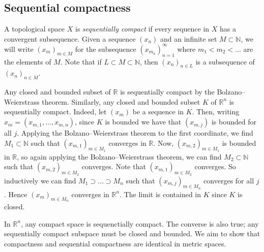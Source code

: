 \subsection{Sequential compactness}
\begin{definition}
	A topological space \( X \) is \textit{sequentially compact} if every sequence in \( X \) has a convergent subsequence.
	Given a sequence \( (x_n) \) and an infinite set \( M \subset \mathbb N \), we will write \( (x_m)_{m \in M} \) for the subsequence \( (x_{m_n})_{n=1}^\infty \) where \( m_1 < m_2 < \dots \) are the elements of \( M \).
	Note that if \( L \subset M \subset \mathbb N \), then \( (x_n)_{n \in L} \) is a subsequence of \( (x_n)_{n \in M} \).
\end{definition}
\begin{example}
	Any closed and bounded subset of \( \mathbb R \) is sequentially compact by the Bolzano--Weierstrass theorem.
	Similarly, any closed and bounded subset \( K \) of \( \mathbb R^n \) is sequentially compact.
	Indeed, let \( (x_m) \) be a sequence in \( K \).
	Then, writing \( x_m = (x_{m,1}, \dots, x_{m,n}) \), since \( K \) is bounded we have that \( (x_{m,j}) \) is bounded for all \( j \).
	Applying the Bolzano--Weierstrass theorem to the first coordinate, we find \( M_1 \subset \mathbb N \) such that \( (x_{m,1})_{m \in M_1} \) converges in \( \mathbb R \).
	Now, \( (x_{m,2})_{m \in M_1} \) is bounded in \( \mathbb R \), so again applying the Bolzano--Weierstrass theorem, we can find \( M_2 \subset \mathbb N \) such that \( (x_{m,2})_{m \in M_2} \) converges.
	Note that \( (x_{m,1})_{m \in M_2} \) converges.
	So inductively we can find \( M_1 \supset \dots \supset M_n \) such that \( (x_{m,j})_{m \in M_n} \) converges for all \( j \).
	Hence \( (x_m)_{m \in M_n} \) converges in \( \mathbb R^n \).
	The limit is contained in \( K \) since \( K \) is closed.
\end{example}
\begin{remark}
	In \( \mathbb R^n \), any compact space is sequenctially compact.
	The converse is also true; any sequentially compact subspace must be closed and bounded.
	We aim to show that compactness and sequential compactness are identical in metric spaces.
\end{remark}

